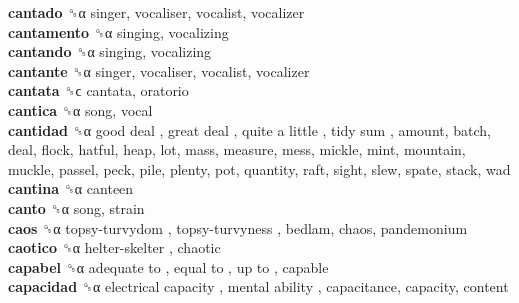 \textbf{cantado} ␝α  singer, vocaliser, vocalist, vocalizer  \\
\textbf{cantamento} ␝α  singing, vocalizing  \\
\textbf{cantando} ␝α  singing, vocalizing  \\
\textbf{cantante} ␝α  singer, vocaliser, vocalist, vocalizer  \\
\textbf{cantata} ␝ϲ  cantata, oratorio  \\
\textbf{cantica} ␝α  song, vocal  \\
\textbf{cantidad} ␝α   good deal ,  great deal ,  quite a little ,  tidy sum , amount, batch, deal, flock, hatful, heap, lot, mass, measure, mess, mickle, mint, mountain, muckle, passel, peck, pile, plenty, pot, quantity, raft, sight, slew, spate, stack, wad  \\
\textbf{cantina} ␝α  canteen  \\
\textbf{canto} ␝α  song, strain  \\
\textbf{caos} ␝α   topsy-turvydom ,  topsy-turvyness , bedlam, chaos, pandemonium  \\
\textbf{caotico} ␝α   helter-skelter , chaotic  \\
\textbf{capabel} ␝α   adequate to ,  equal to ,  up to , capable  \\
\textbf{capacidad} ␝α   electrical capacity ,  mental ability , capacitance, capacity, content  \\
